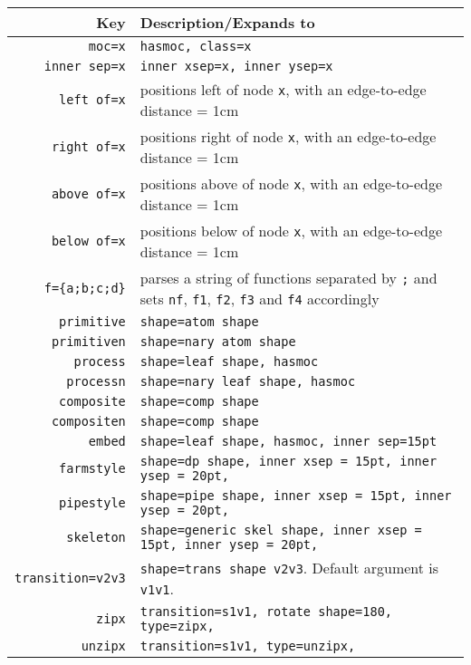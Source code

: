 \documentclass[10pt]{article}
\begin{document}
\begin{longtable} { r|p{11cm} }
  \toprule
  \textbf{Key}  & \textbf{Description/Expands to}  \\
  \midrule
  \texttt{moc=x} & \texttt{hasmoc, class=x} \\
  \texttt{inner sep=x} & \texttt{inner xsep=x, inner ysep=x} \\
  \texttt{left of=x} & positions left of node \texttt{x}, with an edge-to-edge distance = 1cm \\
  \texttt{right of=x} & positions right of node \texttt{x}, with an edge-to-edge distance = 1cm \\
  \texttt{above of=x} & positions above of node \texttt{x}, with an edge-to-edge distance = 1cm \\
  \texttt{below of=x} & positions below of node \texttt{x}, with an edge-to-edge distance = 1cm \\
  \texttt{f=\{a;b;c;d\}} & parses a string of functions separated by \texttt{;} and sets \texttt{nf}, \texttt{f1}, \texttt{f2}, \texttt{f3} and \texttt{f4} accordingly \\
  \texttt{primitive} & \texttt{shape=atom shape} \\
  \texttt{primitiven} & \texttt{shape=nary atom shape} \\
  \texttt{process} & \texttt{shape=leaf shape, hasmoc} \\
  \texttt{processn} & \texttt{shape=nary leaf shape, hasmoc} \\
  \texttt{composite} & \texttt{shape=comp shape} \\
  \texttt{compositen} & \texttt{shape=comp shape} \\
  \texttt{embed} & \texttt{shape=leaf shape, hasmoc, inner sep=15pt} \\
  \texttt{farmstyle} & \texttt{shape=dp shape, inner xsep = 15pt, inner ysep = 20pt,} \\
  \texttt{pipestyle} & \texttt{shape=pipe shape, inner xsep = 15pt, inner ysep = 20pt,} \\
  \texttt{skeleton} & \texttt{shape=generic skel shape, inner xsep = 15pt, inner ysep = 20pt,} \\
  \texttt{transition=v2v3} & \texttt{shape=trans shape v2v3}. Default argument is \texttt{v1v1}. \\
  \texttt{zipx} & \texttt{transition={s1v1}, rotate shape=180, type=zipx,} \\
  \texttt{unzipx} & \texttt{transition={s1v1}, type=unzipx,} \\
  \bottomrule
\end{longtable}
\end{document}
